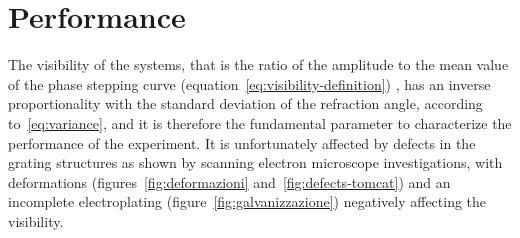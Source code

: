 \section{Performance}
The visibility of the systems, that is the ratio of the amplitude to the
mean value of the phase stepping curve
(equation~\ref{eq:visibility-definition}) , has an inverse proportionality with the
standard deviation of the refraction angle, according
to~\eqref{eq:variance}, and it is therefore the fundamental parameter to
characterize the performance of the experiment. It is unfortunately affected
by defects in the grating structures as shown by scanning electron
microscope investigations, with deformations (figures~\ref{fig:deformazioni}
and~\ref{fig:defects-tomcat})
and an incomplete electroplating (figure~\ref{fig:galvanizzazione})
negatively affecting the visibility.


